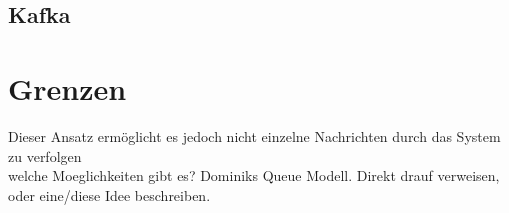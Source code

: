 \subsection{Kafka}

\section{Grenzen}
Dieser Ansatz ermöglicht es jedoch nicht einzelne Nachrichten durch das System zu verfolgen\\

welche Moeglichkeiten gibt es? Dominiks Queue Modell. Direkt drauf verweisen, oder eine/diese Idee beschreiben.\\





